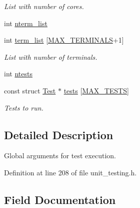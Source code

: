 \begin{DoxyCompactItemize}
\begin{DoxyCompactList}\small\item\em List with number of cores. \end{DoxyCompactList}\item 
int \hyperlink{structprogram__arguments_a48fbd16e4ce7ab5438078817c4931108}{nterm\+\_\+list}
\item 
\mbox{\label{structprogram__arguments_ab05abd5478458bb551479eb3e3dc75b1}} 
int \hyperlink{structprogram__arguments_ab05abd5478458bb551479eb3e3dc75b1}{term\+\_\+list} \mbox{[}\hyperlink{bios_8h_a4e7d162c7c35103b42768ff4a5c73905}{M\+A\+X\+\_\+\+T\+E\+R\+M\+I\+N\+A\+LS}+1\mbox{]}
\begin{DoxyCompactList}\small\item\em List with number of terminals. \end{DoxyCompactList}\item 
int \hyperlink{structprogram__arguments_a8b96bf14afced6bae0d45424ab2fac57}{ntests}
\item 
\mbox{\label{structprogram__arguments_a1db9e2ccc5b4309d559617d2b327e527}} 
const struct \hyperlink{structTest}{Test} $\ast$ \hyperlink{structprogram__arguments_a1db9e2ccc5b4309d559617d2b327e527}{tests} \mbox{[}\hyperlink{group__Testing_ga2a77d2f2c5b698c69c19e1f8782bf709}{M\+A\+X\+\_\+\+T\+E\+S\+TS}\mbox{]}
\begin{DoxyCompactList}\small\item\em Tests to run. \end{DoxyCompactList}\end{DoxyCompactItemize}


\subsection{Detailed Description}
Global arguments for test execution. 

Definition at line 208 of file unit\+\_\+testing.\+h.



\subsection{Field Documentation}
\mbox{\label{structprogram__arguments_ab9717e16b92f14aa8c54dbf4a2d2b7b1}} 
